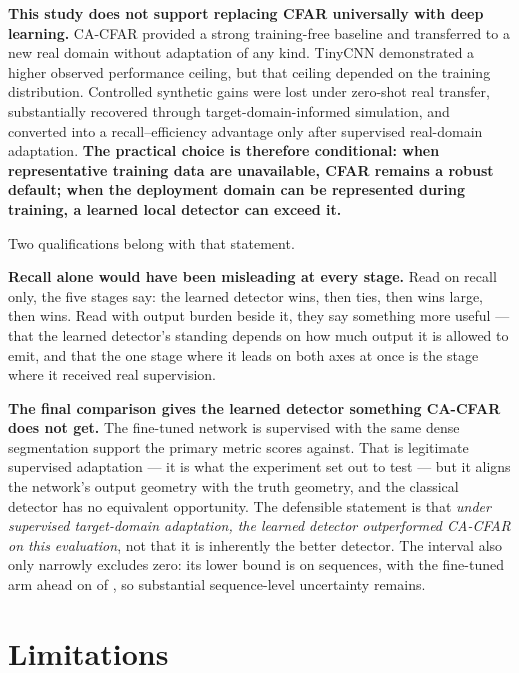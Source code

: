 \textbf{This study does not support replacing CFAR universally with deep learning.} CA-CFAR provided
a strong training-free baseline and transferred to a new real domain without adaptation of any kind.
TinyCNN demonstrated a higher observed performance ceiling, but that ceiling depended on the training
distribution. Controlled synthetic gains were lost under zero-shot real transfer, substantially
recovered through target-domain-informed simulation, and converted into a recall--efficiency
advantage only after supervised real-domain adaptation. \textbf{The practical choice is therefore
conditional: when representative training data are unavailable, CFAR remains a robust default; when
the deployment domain can be represented during training, a learned local detector can exceed it.}

Two qualifications belong with that statement.

\textbf{Recall alone would have been misleading at every stage.} Read on recall only, the five stages
say: the learned detector wins, then ties, then wins large, then wins. Read with output burden beside
it, they say something more useful --- that the learned detector's standing depends on how much output
it is allowed to emit, and that the one stage where it leads on both axes at once is the stage where
it received real supervision.

\textbf{The final comparison gives the learned detector something CA-CFAR does not get.} The
fine-tuned network is supervised with the same dense segmentation support the primary metric scores
against. That is legitimate supervised adaptation --- it is what the experiment set out to test --- but
it aligns the network's output geometry with the truth geometry, and the classical detector has no
equivalent opportunity. The defensible statement is that \emph{under supervised target-domain
adaptation, the learned detector outperformed CA-CFAR on this evaluation}, not that it is inherently
the better detector. The interval also only narrowly excludes zero: its lower bound is \FtCIlo{} on
\FtNseq{} sequences, with the fine-tuned arm ahead on \FtSeqAhead{} of \FtNseq{}, so substantial
sequence-level uncertainty remains.

\section*{Limitations}

